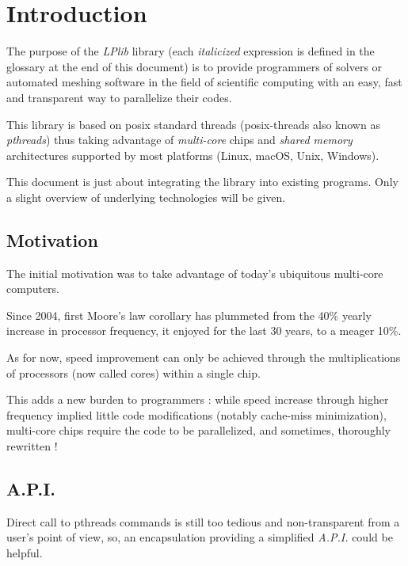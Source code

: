 \documentclass[a4paper,12pt]{article}
\begin{document}
\clearpage


%
%

\section{Introduction}

The purpose of the \emph{LPlib} library (each \emph{italicized} expression is defined in the glossary at the end of this document) is to provide programmers of solvers or automated meshing software in the field of scientific computing with an easy, fast and transparent way to parallelize their codes.

This library is based on posix standard threads (posix-threads \cite{book_pthreads} also known as \emph{pthreads}) thus taking advantage of \emph{multi-core} chips and \emph{shared memory} architectures supported by most platforms (Linux, macOS, Unix, Windows).

This document is just about integrating the library into existing programs. Only a slight overview of underlying technologies will be given.

\subsection{Motivation}

The initial motivation was to take advantage of today's ubiquitous multi-core computers.

Since 2004, first Moore's law corollary has plummeted from the 40\% yearly increase in processor frequency, it enjoyed for the last 30 years, to a meager 10\%.

As for now, speed improvement can only be achieved through the multiplications of processors (now called cores) within a single chip.

This adds a new burden to programmers : while speed increase through higher frequency implied little code modifications (notably cache-miss minimization), multi-core chips require the code to be parallelized, and sometimes, thoroughly rewritten !

\subsection{A.P.I.}

Direct call to pthreads commands is still too tedious and non-transparent from a user's point of view, so, an encapsulation providing a simplified \emph{A.P.I.} could be helpful.
\end{document}
